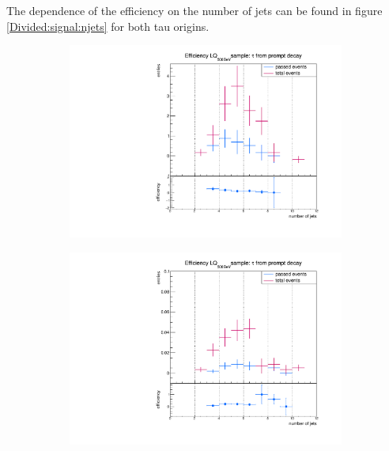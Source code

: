 %
The dependence of the efficiency on the number of jets can be found in figure \ref{Divided:signal:njets} for both tau origins.
%
\begin{figure}
  \centering
                \begin{subfigure}[t]{0.49\textwidth}
                \includegraphics[width=\textwidth]{figures/plots/LQ75/Divided_promptnjets.pdf}
                \label{Dividedprompt:signal:njetsLQ75}
                \end{subfigure}
                \begin{subfigure}[t]{0.49\textwidth}
                \includegraphics[width=\textwidth]{figures/plots/LQ76/Divided_promptnjets.pdf}

\end{subfigure}
\end{figure}
